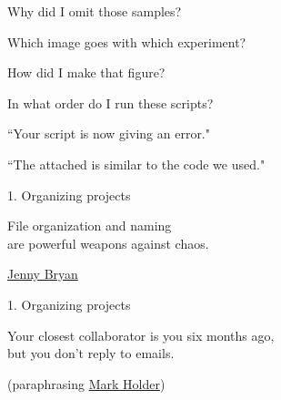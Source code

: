 \documentclass[aspectratio=169,12pt,t]{beamer}
\begin{document}
\begin{frame}[c]{}
\centerline{\Large Why did I omit those samples?}
\end{frame}



\begin{frame}[c]{}
\centerline{\Large Which image goes with which experiment?}
\end{frame}



\begin{frame}[c]{}
\centerline{\Large How did I make that figure?}
\end{frame}


\begin{frame}[c]{}
\centerline{\Large In what order do I run these scripts?}
\end{frame}



\begin{frame}[c]{}
\centerline{\Large ``Your script is now giving an error."}
\end{frame}



\begin{frame}[c]{}
\centerline{\Large ``The attached is similar to the code we used."}
\end{frame}




\begin{frame}[c]{1. Organizing projects}

\begin{center}
\large
File organization and naming \\
are powerful weapons against chaos.
\end{center}

\hfill
{\lolit
{\textendash} \href{http://www.stat.ubc.ca/~jenny/}{Jenny Bryan}
}

\end{frame}


\begin{frame}[c]{1. Organizing projects}

\begin{center}
\large
Your closest collaborator is you six months ago, \\
but you don't reply to emails.
\end{center}

\hfill
{\lolit
(paraphrasing \href{https://twitter.com/kcranstn/status/370914072511791104}{Mark Holder})
}

\end{frame}
\end{document}
